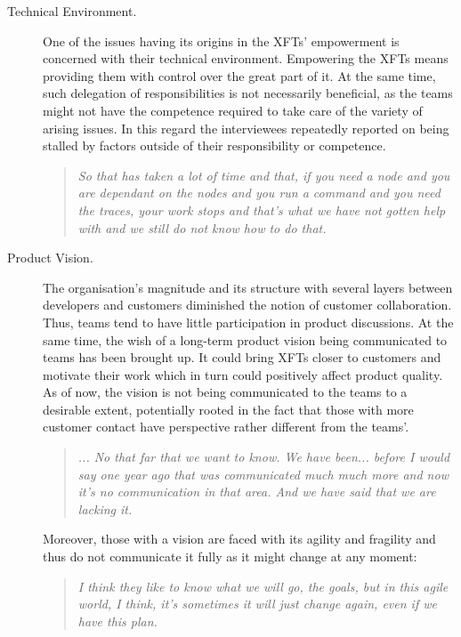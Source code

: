 \begin{description}
    \item [Technical Environment.] One of the issues having its origins in the \acp{XFT}' empowerment is concerned with their technical environment. Empowering the XFTs means providing them with control over the great part of it. At the same time, such delegation of responsibilities is not necessarily beneficial, as the teams might not have the competence required to take care of the variety of arising issues. In this regard the interviewees repeatedly reported on being stalled by factors outside of their responsibility or competence.
    
      \begin{quote}\itshape So that has taken a lot of time and that, if you need a node and you are dependant on the nodes and you run a command and you need the traces, your work stops and that's what we have not gotten help with and we still do not know how to do that.
      \end{quote}

    \item [Product Vision.] The organisation's magnitude and its structure with several layers between developers and customers diminished the notion of customer collaboration. Thus, teams tend to have little participation in product discussions. At the same time, the wish of a long-term product vision being communicated to teams has been brought up. It could bring \acp{XFT} closer to customers and motivate their work which in turn could positively affect product quality. As of now, the vision is not being communicated to the teams to a desirable extent, potentially rooted in the fact that those with more customer contact have perspective rather different from the teams'.
    
      \begin{quote}\itshape... No that far that we want to know. We have been... before I would say one year ago that was communicated much much more and now it's no communication in that area. And we have said that we are lacking it.
      \end{quote}

   Moreover, those with a vision are faced with its agility and fragility and thus do not communicate it fully as it might change at any moment:

      \begin{quote}\itshape I think they like to know what we will go, the goals, but in this agile world, I think, it’s sometimes it will just change again, even if we have this plan.
      \end{quote}


\end{description}
